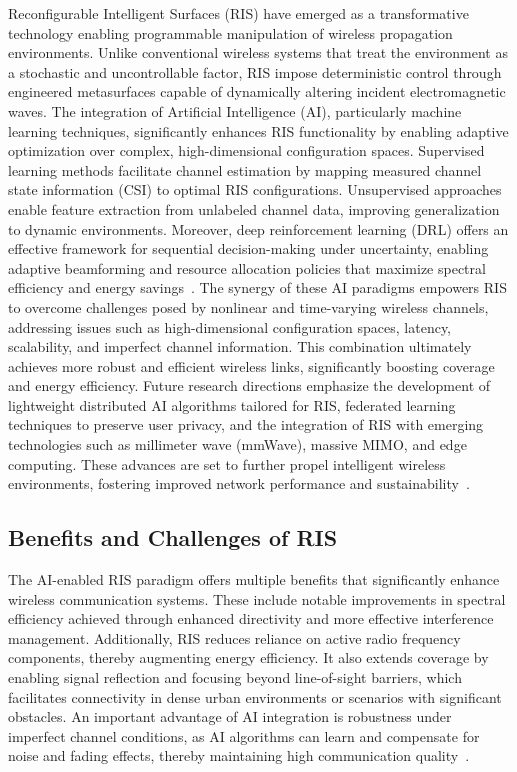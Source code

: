 \documentclass[sigconf]{acmart}
\begin{document}
Reconfigurable Intelligent Surfaces (RIS) have emerged as a transformative technology enabling programmable manipulation of wireless propagation environments. Unlike conventional wireless systems that treat the environment as a stochastic and uncontrollable factor, RIS impose deterministic control through engineered metasurfaces capable of dynamically altering incident electromagnetic waves. The integration of Artificial Intelligence (AI), particularly machine learning techniques, significantly enhances RIS functionality by enabling adaptive optimization over complex, high-dimensional configuration spaces. Supervised learning methods facilitate channel estimation by mapping measured channel state information (CSI) to optimal RIS configurations. Unsupervised approaches enable feature extraction from unlabeled channel data, improving generalization to dynamic environments. Moreover, deep reinforcement learning (DRL) offers an effective framework for sequential decision-making under uncertainty, enabling adaptive beamforming and resource allocation policies that maximize spectral efficiency and energy savings~\cite{ref49}. The synergy of these AI paradigms empowers RIS to overcome challenges posed by nonlinear and time-varying wireless channels, addressing issues such as high-dimensional configuration spaces, latency, scalability, and imperfect channel information. This combination ultimately achieves more robust and efficient wireless links, significantly boosting coverage and energy efficiency. Future research directions emphasize the development of lightweight distributed AI algorithms tailored for RIS, federated learning techniques to preserve user privacy, and the integration of RIS with emerging technologies such as millimeter wave (mmWave), massive MIMO, and edge computing. These advances are set to further propel intelligent wireless environments, fostering improved network performance and sustainability~\cite{ref49}.

\subsection{Benefits and Challenges of RIS}

The AI-enabled RIS paradigm offers multiple benefits that significantly enhance wireless communication systems. These include notable improvements in spectral efficiency achieved through enhanced directivity and more effective interference management. Additionally, RIS reduces reliance on active radio frequency components, thereby augmenting energy efficiency. It also extends coverage by enabling signal reflection and focusing beyond line-of-sight barriers, which facilitates connectivity in dense urban environments or scenarios with significant obstacles. An important advantage of AI integration is robustness under imperfect channel conditions, as AI algorithms can learn and compensate for noise and fading effects, thereby maintaining high communication quality~\cite{ref49}.
\end{document}

